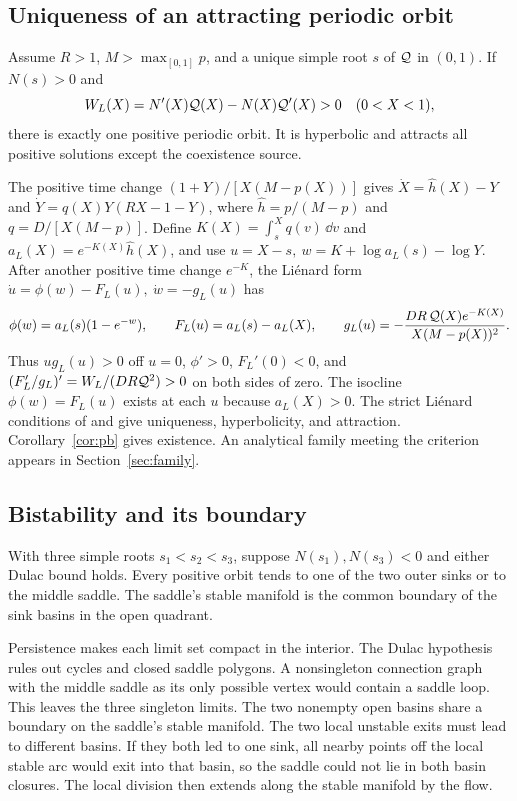 \subsection{Uniqueness of an attracting periodic orbit}\label{sec:onecycle}
\begin{theorem}\label{thm:cycle}
Assume \(R>1\), \(M>\max_{[0,1]}p\), and a unique simple root \(s\) of \(\mathcal Q\) in \((0,1)\). If \(N(s)>0\) and
\[
 W_L(X)=N'(X)\mathcal Q(X)-N(X)\mathcal Q'(X)>0\quad (0<X<1),
\]
there is exactly one positive periodic orbit. It is hyperbolic and attracts all positive solutions except the coexistence source.
\end{theorem}
The positive time change \((1+Y)/[X(M-p(X))]\) gives \(\dot X=\widehat h(X)-Y\) and \(\dot Y=q(X)Y(RX-1-Y)\), where \(\widehat h=p/(M-p)\) and \(q=D/[X(M-p)]\). Define \(K(X)=\int_s^Xq(v)\,\dd v\) and \(a_L(X)=e^{-K(X)}\widehat h(X)\), and use \(u=X-s,\ w=K+\log a_L(s)-\log Y\). After another positive time change \(e^{-K}\), the Li\'enard form \(\dot u=\phi(w)-F_L(u),\ \dot w=-g_L(u)\) has
\[
 \phi(w)=a_L(s)(1-e^{-w}),\qquad F_L(u)=a_L(s)-a_L(X),\qquad
 g_L(u)=-\frac{DR\,\mathcal Q(X)e^{-K(X)}}{X(M-p(X))^2}.
\]
Thus \(ug_L(u)>0\) off \(u=0\), \(\phi'>0\), \(F_L'(0)<0\), and \((F_L'/g_L)'=W_L/(DR\mathcal Q^2)>0\) on both sides of zero. The isocline \(\phi(w)=F_L(u)\) exists at each \(u\) because \(a_L(X)>0\). The strict Li\'enard conditions of \citet[Lemma~1]{zegeling93} and \citet[Theorem~4.1]{wang11} give uniqueness, hyperbolicity, and attraction. Corollary~\ref{cor:pb} gives existence. An analytical family meeting the criterion appears in Section~\ref{sec:family}.

\subsection{Bistability and its boundary}
\begin{theorem}\label{thm:basin}
With three simple roots \(s_1<s_2<s_3\), suppose \(N(s_1),N(s_3)<0\) and either Dulac bound holds. Every positive orbit tends to one of the two outer sinks or to the middle saddle. The saddle's stable manifold is the common boundary of the sink basins in the open quadrant.
\end{theorem}
Persistence makes each limit set compact in the interior. The Dulac hypothesis rules out cycles and closed saddle polygons. A nonsingleton connection graph with the middle saddle as its only possible vertex would contain a saddle loop. This leaves the three singleton limits. The two nonempty open basins share a boundary on the saddle's stable manifold. The two local unstable exits must lead to different basins. If they both led to one sink, all nearby points off the local stable arc would exit into that basin, so the saddle could not lie in both basin closures. The local division then extends along the stable manifold by the flow.

